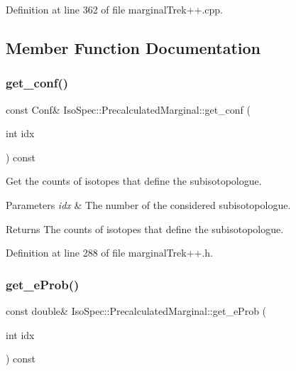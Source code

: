 Definition at line 362 of file marginal\+Trek++.\+cpp.



\subsection{Member Function Documentation}
\mbox{\label{class_iso_spec_1_1_precalculated_marginal_a3ecbbf1263a274cc8e3bc71cd96f0bff}} 
\subsubsection{\texorpdfstring{get\+\_\+conf()}{get\_conf()}}
{\footnotesize\ttfamily const Conf\& Iso\+Spec\+::\+Precalculated\+Marginal\+::get\+\_\+conf (\begin{DoxyParamCaption}\item[{int}]{idx }\end{DoxyParamCaption}) const\hspace{0.3cm}{\ttfamily [inline]}}



Get the counts of isotopes that define the subisotopologue. 


\begin{DoxyParams}{Parameters}
{\em idx} & The number of the considered subisotopologue. \\
\hline
\end{DoxyParams}
\begin{DoxyReturn}{Returns}
The counts of isotopes that define the subisotopologue. 
\end{DoxyReturn}


Definition at line 288 of file marginal\+Trek++.\+h.

\mbox{\label{class_iso_spec_1_1_precalculated_marginal_a7a38a567eadf16fa2ad41e81c8f55c02}} 
\subsubsection{\texorpdfstring{get\+\_\+e\+Prob()}{get\_eProb()}}
{\footnotesize\ttfamily const double\& Iso\+Spec\+::\+Precalculated\+Marginal\+::get\+\_\+e\+Prob (\begin{DoxyParamCaption}\item[{int}]{idx }\end{DoxyParamCaption}) const\hspace{0.3cm}{\ttfamily [inline]}}



